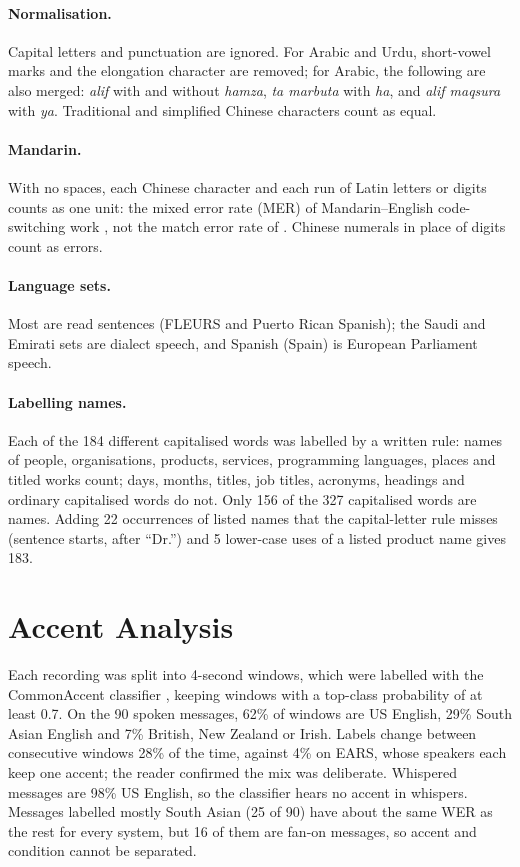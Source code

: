 \documentclass[11pt]{article}
\begin{document}
\paragraph{Normalisation.} Capital letters and punctuation are ignored. For Arabic and Urdu, short-vowel marks and the elongation character are removed; for Arabic, the following are also merged: \textit{alif} with and without \textit{hamza}, \textit{ta marbuta} with \textit{ha}, and \textit{alif maqsura} with \textit{ya}. Traditional and simplified Chinese characters count as equal.

\paragraph{Mandarin.} With no spaces, each Chinese character and each run of Latin letters or digits counts as one unit: the mixed error rate (MER) of Mandarin--English code-switching work \citep{lyu2010seame}, not the match error rate of \citet{morris2004wer}. Chinese numerals in place of digits count as errors.

\paragraph{Language sets.} Most are read sentences (FLEURS and Puerto Rican Spanish); the Saudi and Emirati sets are dialect speech, and Spanish (Spain) is European Parliament speech.

\paragraph{Labelling names.} Each of the 184 different capitalised words was labelled by a written rule: names of people, organisations, products, services, programming languages, places and titled works count; days, months, titles, job titles, acronyms, headings and ordinary capitalised words do not. Only 156 of the 327 capitalised words are names. Adding 22 occurrences of listed names that the capital-letter rule misses (sentence starts, after ``Dr.'') and 5 lower-case uses of a listed product name gives 183.

\section{Accent Analysis}\label{app:accent}
Each recording was split into 4-second windows, which were labelled with the CommonAccent classifier \citep{zuluagagomez2023commonaccent}, keeping windows with a top-class probability of at least 0.7. On the 90 spoken messages, 62\% of windows are US English, 29\% South Asian English and 7\% British, New Zealand or Irish. Labels change between consecutive windows 28\% of the time, against 4\% on EARS, whose speakers each keep one accent; the reader confirmed the mix was deliberate. Whispered messages are 98\% US English, so the classifier hears no accent in whispers. Messages labelled mostly South Asian (25 of 90) have about the same WER as the rest for every system, but 16 of them are fan-on messages, so accent and condition cannot be separated.
\end{document}

